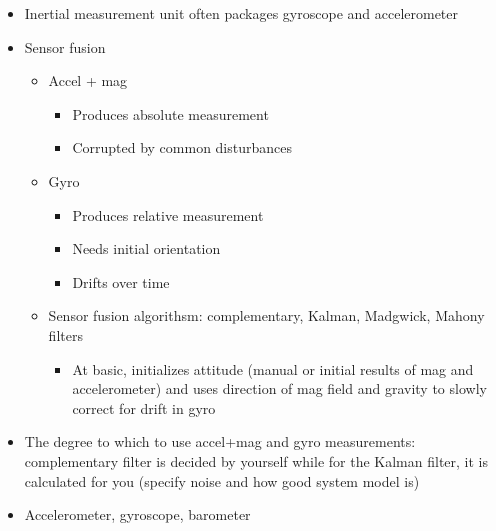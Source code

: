 \documentclass{article}
\begin{document}
\begin{itemize}
\begin{itemize}
        \item Add $\Delta a$ to previous orientation to get current orientation
        \begin{itemize}
            \item Dead reckoning and just is integrating gyro measurement
            \item Downsides: need to known initial orientation and sensor biases
            \item Integration acts as a low pass filter so that high frequency noise is smoothed out but result drifts away from true position due to random walk and integrating any biases
        \end{itemize}
    \end{itemize}
    \item Inertial measurement unit often packages gyroscope and accelerometer
    \item Sensor fusion
    \begin{itemize}
        \item Accel + mag
        \begin{itemize}
            \item Produces absolute measurement
            \item Corrupted by common disturbances
        \end{itemize}
        \item Gyro
        \begin{itemize}
            \item Produces relative measurement
            \item Needs initial orientation
            \item Drifts over time
        \end{itemize}
        \item Sensor fusion algorithsm: complementary, Kalman, Madgwick, Mahony filters
        \begin{itemize}
            \item At basic, initializes attitude (manual or initial results of mag and accelerometer) and uses direction of mag field and gravity to slowly correct for drift in gyro
        \end{itemize}
    \end{itemize}
    \item The degree to which to use accel+mag and gyro measurements: complementary filter is decided by yourself while for the Kalman filter, it is calculated for you (specify noise and how good system model is)
    \item Accelerometer, gyroscope, barometer
\end{itemize}
\end{document}
